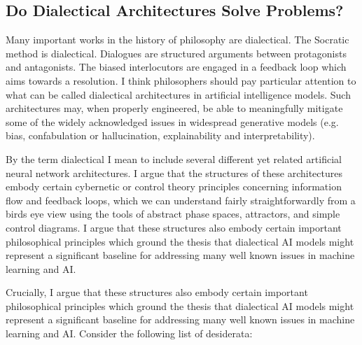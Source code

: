 \documentclass[11pt, oneside]{article}   	%
\begin{document}




\subsection{Do Dialectical Architectures Solve Problems?}



Many important works in the history of philosophy are dialectical.  The Socratic method is dialectical.  Dialogues are structured arguments between protagonists and antagonists.  The biased interlocutors are engaged in a feedback loop which aims towards a resolution.  I think philosophers should pay particular attention to what can be called dialectical architectures in artificial intelligence models.  Such architectures may, when properly engineered, be able to meaningfully mitigate some of the widely acknowledged issues in widespread generative models (e.g. bias, confabulation or hallucination, explainability and interpretability).

By the term dialectical I mean to include several different yet related artificial neural network architectures.  I argue that the structures of these architectures embody certain cybernetic or control theory principles concerning information flow and feedback loops, which we can understand fairly straightforwardly from a birds eye view using the tools of abstract phase spaces, attractors, and simple control diagrams.  I argue that these structures also embody certain important philosophical principles which ground the thesis that dialectical AI models might represent a significant baseline for addressing many well known issues in machine learning and AI.





Crucially, I argue that these structures also embody certain important philosophical principles which ground the thesis that dialectical AI models might represent a significant baseline for addressing many well known issues in machine learning and AI.  Consider the following list of desiderata:
\end{document}
